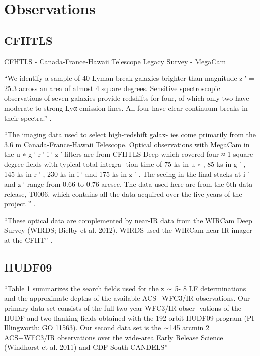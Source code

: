 \documentclass[manuscript]{aastex}
\begin{document}
\section{Observations}

  \subsection{CFHTLS}
  
  CFHTLS - Canada-France-Hawaii Telescope Legacy Survey - MegaCam\citep{willott13}

  ``We identify a sample of 40 Lyman break galaxies brighter than
    magnitude z ′ = 25.3 across an area of almost 4 square degrees.
    Sensitive spectroscopic observations of seven galaxies provide 
    redshifts for four, of which only two have moderate to strong 
    Lyα emission lines. All four have clear continuum breaks in 
    their spectra.'' \cite{willott13}.

  ``The imaging data used to select high-redshift galax-
    ies come primarily from the 3.6 m Canada-France-Hawaii
    Telescope. Optical observations with MegaCam in the
    u ∗ g ′ r ′ i ′ z ′ filters are from CFHTLS Deep which covered
    four ≈ 1 square degree fields with typical total integra-
    tion time of 75 ks in u ∗ , 85 ks in g ′ , 145 ks in r ′ , 230 ks in
    i ′ and 175 ks in z ′ . The seeing in the final stacks at i ′ and
    z ′ range from 0.66 to 0.76 arcsec. The data used here are
    from the 6th data release, T0006, which contains all the
    data acquired over the five years of the project '' \cite{willott13}.

  ``These optical data are complemented by near-IR data
    from the WIRCam Deep Survey (WIRDS; Bielby et al.
    2012). WIRDS used the WIRCam near-IR imager at
    the CFHT'' \cite{willott13}.

  \subsection{HUDF09}

  ``Table 1 summarizes the search fields used for the z ∼ 5-
    8 LF determinations and the approximate depths of the
    available ACS+WFC3/IR observations. Our primary
    data set consists of the full two-year WFC3/IR obser-
    vations of the HUDF and two flanking fields obtained
    with the 192-orbit HUDF09 program (PI Illingworth:
    GO 11563). Our second data set is the ∼145 arcmin 2
    ACS+WFC3/IR observations over the wide-area Early
    Release Science (Windhorst et al. 2011) and CDF-South
    CANDELS'' \cite{bouwens12}
    
\end{document}
